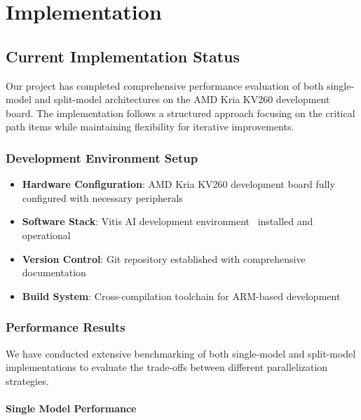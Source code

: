 \chapter{Implementation}\label{chap:implementation}

\section{Current Implementation Status}\label{sec:current-status}

Our project has completed comprehensive performance evaluation of both single-model and split-model architectures on the AMD Kria KV260 development board. The implementation follows a structured approach focusing on the critical path items while maintaining flexibility for iterative improvements.

\subsection{Development Environment Setup}\label{subsec:development-environment}

\begin{itemize}
\item \textbf{Hardware Configuration}: AMD Kria KV260 development board fully configured with necessary peripherals
\item \textbf{Software Stack}: Vitis AI development environment~\cite{amd2023vitis} installed and operational
\item \textbf{Version Control}: Git repository established with comprehensive documentation
\item \textbf{Build System}: Cross-compilation toolchain for ARM-based development
\end{itemize}

\subsection{Performance Results}\label{subsec:performance-results}

We have conducted extensive benchmarking of both single-model and split-model implementations to evaluate the trade-offs between different parallelization strategies.

\subsubsection{Single Model Performance}\label{subsubsec:single-model-performance}

